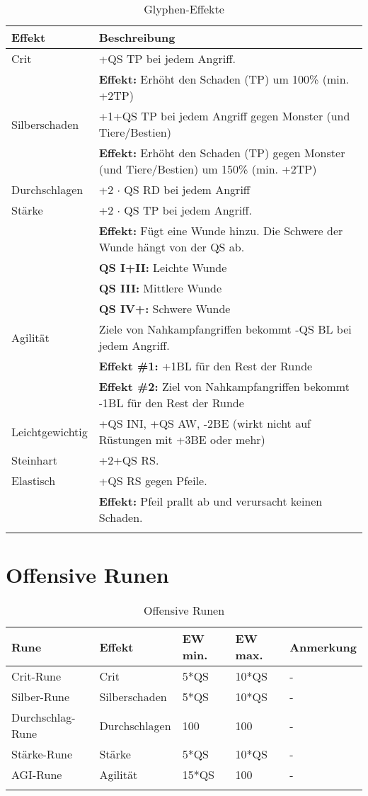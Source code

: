 \begin{longtable}{|p{3cm}|p{12.5cm}|}
\hline
\textbf{Effekt} & \textbf{Beschreibung} \\

\hline
Crit & +QS TP bei jedem Angriff. \\
& \textbf{Effekt:} Erhöht den Schaden (TP) um 100\% (min. +2TP) \\
\hline
Silberschaden & +1+QS TP bei jedem Angriff gegen Monster (und Tiere/Bestien) \\
& \textbf{Effekt:} Erhöht den Schaden (TP) gegen Monster (und Tiere/Bestien) um 150\% (min. +2TP) \\
\hline
Durchschlagen & +2 $\cdot$ QS RD bei jedem Angriff \\
\hline
Stärke & +2 $\cdot$ QS TP bei jedem Angriff. \\
& \textbf{Effekt:} Fügt eine Wunde hinzu. Die Schwere der Wunde hängt von der QS ab. \\
& \textbf{QS I+II:} Leichte Wunde \\
& \textbf{QS III:} Mittlere Wunde \\
& \textbf{QS IV+:} Schwere Wunde \\
\hline
Agilität & Ziele von Nahkampfangriffen bekommt -QS BL bei jedem Angriff. \\
& \textbf{Effekt \#1:} +1BL für den Rest der Runde \\
& \textbf{Effekt \#2:} Ziel von Nahkampfangriffen bekommt -1BL für den Rest der Runde \\
\hline
Leichtgewichtig & +QS INI, +QS AW, -2BE (wirkt nicht auf Rüstungen mit +3BE oder mehr) \\
\hline
Steinhart & +2+QS RS. \\
\hline
Elastisch & +QS RS gegen Pfeile. \\
& \textbf{Effekt:} Pfeil prallt ab und verursacht keinen Schaden. \\
\hline

\caption{Glyphen-Effekte}
\label{tab:GlyphenEffekte}
\end{longtable}


\section{Offensive Runen}
\begin{longtable}{|l|l|l|l|l|}
\hline
\textbf{Rune} & \textbf{Effekt} & \textbf{EW min.} & \textbf{EW max.} & \textbf{Anmerkung} \\

\hline
Crit-Rune & Crit & 5*QS & 10*QS & - \\ 
\hline
Silber-Rune & Silberschaden & 5*QS & 10*QS & - \\ 
\hline
Durchschlag-Rune & Durchschlagen & 100 & 100 & - \\ 
\hline
Stärke-Rune & Stärke & 5*QS & 10*QS & - \\ 
\hline
AGI-Rune & Agilität & 15*QS & 100 & - \\ 
\hline

\caption{Offensive Runen}
\label{tab:OffensiveRunen}
\end{longtable}


